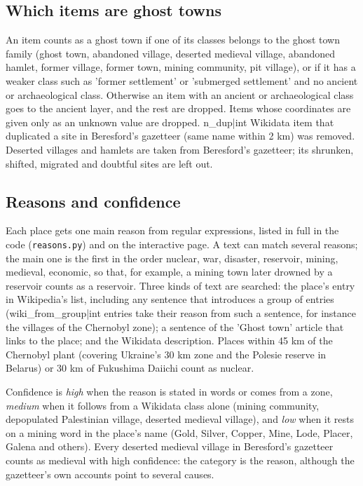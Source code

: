 \documentclass[11pt,a4paper]{article}
\begin{document}
\subsection{Which items are ghost towns}
An item counts as a ghost town if one of its classes belongs to the ghost town family (ghost town, abandoned village, deserted medieval village, abandoned hamlet, former village, former town, mining community, pit village), or if it has a weaker class such as 'former settlement' or 'submerged settlement' and no ancient or archaeological class. Otherwise an item with an ancient or archaeological class goes to the ancient layer, and the rest are dropped. Items whose coordinates are given only as an unknown value are dropped. {{n_dup|int}} Wikidata item that duplicated a site in Beresford's gazetteer (same name within 2 km) was removed. Deserted villages and hamlets are taken from Beresford's gazetteer; its shrunken, shifted, migrated and doubtful sites are left out.

\subsection{Reasons and confidence}
Each place gets one main reason from regular expressions, listed in full in the code (\texttt{reasons.py}) and on the interactive page. A text can match several reasons; the main one is the first in the order nuclear, war, disaster, reservoir, mining, medieval, economic, so that, for example, a mining town later drowned by a reservoir counts as a reservoir. Three kinds of text are searched: the place's entry in Wikipedia's list, including any sentence that introduces a group of entries ({{wiki_from_group|int}} entries take their reason from such a sentence, for instance the villages of the Chernobyl zone); a sentence of the 'Ghost town' article that links to the place; and the Wikidata description. Places within 45 km of the Chernobyl plant (covering Ukraine's 30 km zone and the Polesie reserve in Belarus) or 30 km of Fukushima Daiichi count as nuclear.

Confidence is \emph{high} when the reason is stated in words or comes from a zone, \emph{medium} when it follows from a Wikidata class alone (mining community, depopulated Palestinian village, deserted medieval village), and \emph{low} when it rests on a mining word in the place's name (Gold, Silver, Copper, Mine, Lode, Placer, Galena and others). Every deserted medieval village in Beresford's gazetteer counts as medieval with high confidence: the category is the reason, although the gazetteer's own accounts point to several causes.
\end{document}
